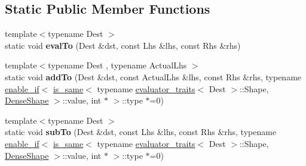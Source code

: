 \subsection*{Static Public Member Functions}
\begin{DoxyCompactItemize}
\item 
\mbox{\label{struct_eigen_1_1internal_1_1generic__product__impl_3_01_lhs_00_01_rhs_00_01_sparse_shape_00_01_s0f15bf86456099378e4a76f37323e721_ae8120253927b82861baf21a731945ca1}} 
{\footnotesize template$<$typename Dest $>$ }\\static void {\bfseries eval\+To} (Dest \&dst, const Lhs \&lhs, const Rhs \&rhs)
\item 
\mbox{\label{struct_eigen_1_1internal_1_1generic__product__impl_3_01_lhs_00_01_rhs_00_01_sparse_shape_00_01_s0f15bf86456099378e4a76f37323e721_a6db287bafc98befa6baadd1697dcd652}} 
{\footnotesize template$<$typename Dest , typename Actual\+Lhs $>$ }\\static void {\bfseries add\+To} (Dest \&dst, const Actual\+Lhs \&lhs, const Rhs \&rhs, typename \mbox{\hyperlink{struct_eigen_1_1internal_1_1enable__if}{enable\+\_\+if}}$<$ \mbox{\hyperlink{struct_eigen_1_1internal_1_1is__same}{is\+\_\+same}}$<$ typename \mbox{\hyperlink{struct_eigen_1_1internal_1_1evaluator__traits}{evaluator\+\_\+traits}}$<$ Dest $>$\+::Shape, \mbox{\hyperlink{struct_eigen_1_1_dense_shape}{Dense\+Shape}} $>$\+::value, int $\ast$ $>$\+::type $\ast$=0)
\item 
\mbox{\label{struct_eigen_1_1internal_1_1generic__product__impl_3_01_lhs_00_01_rhs_00_01_sparse_shape_00_01_s0f15bf86456099378e4a76f37323e721_adc42147c9f7aa61718fa943f5b77fd59}} 
{\footnotesize template$<$typename Dest $>$ }\\static void {\bfseries sub\+To} (Dest \&dst, const Lhs \&lhs, const Rhs \&rhs, typename \mbox{\hyperlink{struct_eigen_1_1internal_1_1enable__if}{enable\+\_\+if}}$<$ \mbox{\hyperlink{struct_eigen_1_1internal_1_1is__same}{is\+\_\+same}}$<$ typename \mbox{\hyperlink{struct_eigen_1_1internal_1_1evaluator__traits}{evaluator\+\_\+traits}}$<$ Dest $>$\+::Shape, \mbox{\hyperlink{struct_eigen_1_1_dense_shape}{Dense\+Shape}} $>$\+::value, int $\ast$ $>$\+::type $\ast$=0)
\end{DoxyCompactItemize}
